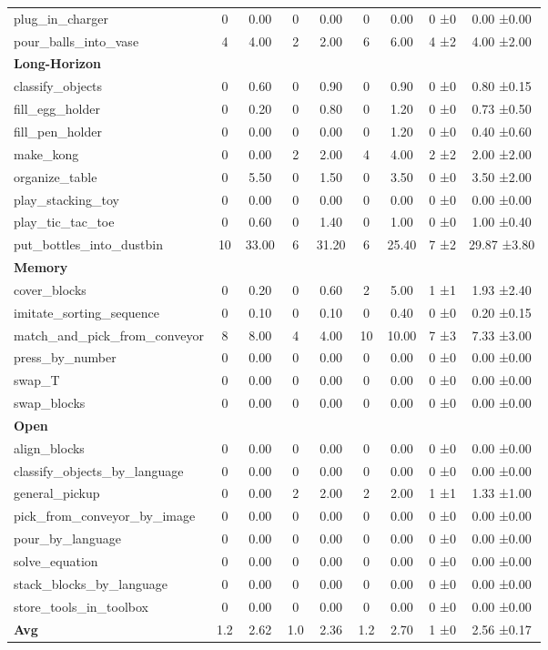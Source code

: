\begin{table}[H]
{\begin{tabular}{l|c|c|c|c|c|c|c|c}
plug\_in\_charger & 0 & 0.00 & 0 & 0.00 & 0 & 0.00 & 0 ±0 & 0.00 ±0.00 \\
pour\_balls\_into\_vase & 4 & 4.00 & 2 & 2.00 & 6 & 6.00 & 4 ±2 & 4.00 ±2.00 \\
\hline
\multicolumn{9}{l}{\textbf{Long-Horizon}} \\
classify\_objects & 0 & 0.60 & 0 & 0.90 & 0 & 0.90 & 0 ±0 & 0.80 ±0.15 \\
fill\_egg\_holder & 0 & 0.20 & 0 & 0.80 & 0 & 1.20 & 0 ±0 & 0.73 ±0.50 \\
fill\_pen\_holder & 0 & 0.00 & 0 & 0.00 & 0 & 1.20 & 0 ±0 & 0.40 ±0.60 \\
make\_kong & 0 & 0.00 & 2 & 2.00 & 4 & 4.00 & 2 ±2 & 2.00 ±2.00 \\
organize\_table & 0 & 5.50 & 0 & 1.50 & 0 & 3.50 & 0 ±0 & 3.50 ±2.00 \\
play\_stacking\_toy & 0 & 0.00 & 0 & 0.00 & 0 & 0.00 & 0 ±0 & 0.00 ±0.00 \\
play\_tic\_tac\_toe & 0 & 0.60 & 0 & 1.40 & 0 & 1.00 & 0 ±0 & 1.00 ±0.40 \\
put\_bottles\_into\_dustbin & 10 & 33.00 & 6 & 31.20 & 6 & 25.40 & 7 ±2 & 29.87 ±3.80 \\
\hline
\multicolumn{9}{l}{\textbf{Memory}} \\
cover\_blocks & 0 & 0.20 & 0 & 0.60 & 2 & 5.00 & 1 ±1 & 1.93 ±2.40 \\
imitate\_sorting\_sequence & 0 & 0.10 & 0 & 0.10 & 0 & 0.40 & 0 ±0 & 0.20 ±0.15 \\
match\_and\_pick\_from\_conveyor & 8 & 8.00 & 4 & 4.00 & 10 & 10.00 & 7 ±3 & 7.33 ±3.00 \\
press\_by\_number & 0 & 0.00 & 0 & 0.00 & 0 & 0.00 & 0 ±0 & 0.00 ±0.00 \\
swap\_T & 0 & 0.00 & 0 & 0.00 & 0 & 0.00 & 0 ±0 & 0.00 ±0.00 \\
swap\_blocks & 0 & 0.00 & 0 & 0.00 & 0 & 0.00 & 0 ±0 & 0.00 ±0.00 \\
\hline
\multicolumn{9}{l}{\textbf{Open}} \\
align\_blocks & 0 & 0.00 & 0 & 0.00 & 0 & 0.00 & 0 ±0 & 0.00 ±0.00 \\
classify\_objects\_by\_language & 0 & 0.00 & 0 & 0.00 & 0 & 0.00 & 0 ±0 & 0.00 ±0.00 \\
general\_pickup & 0 & 0.00 & 2 & 2.00 & 2 & 2.00 & 1 ±1 & 1.33 ±1.00 \\
pick\_from\_conveyor\_by\_image & 0 & 0.00 & 0 & 0.00 & 0 & 0.00 & 0 ±0 & 0.00 ±0.00 \\
pour\_by\_language & 0 & 0.00 & 0 & 0.00 & 0 & 0.00 & 0 ±0 & 0.00 ±0.00 \\
solve\_equation & 0 & 0.00 & 0 & 0.00 & 0 & 0.00 & 0 ±0 & 0.00 ±0.00 \\
stack\_blocks\_by\_language & 0 & 0.00 & 0 & 0.00 & 0 & 0.00 & 0 ±0 & 0.00 ±0.00 \\
store\_tools\_in\_toolbox & 0 & 0.00 & 0 & 0.00 & 0 & 0.00 & 0 ±0 & 0.00 ±0.00 \\
\hline
\textbf{Avg} & 1.2 & 2.62 & 1.0 & 2.36 & 1.2 & 2.70 & 1 ±0 & 2.56 ±0.17 \\
\hline
\end{tabular}
}
\end{table}
